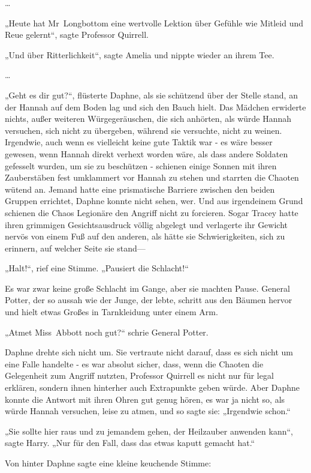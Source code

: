 {…

„Heute hat Mr~Longbottom eine wertvolle Lektion über Gefühle wie Mitleid und Reue gelernt“, sagte Professor Quirrell.

„Und über Ritterlichkeit“, sagte Amelia und nippte wieder an ihrem Tee.

…

„Geht es dir gut?“, flüsterte Daphne, als sie schützend über der Stelle stand, an der Hannah auf dem Boden lag und sich den Bauch hielt. Das Mädchen erwiderte nichts, außer weiteren Würgegeräuschen, die sich anhörten, als würde Hannah versuchen, sich nicht zu übergeben, während sie versuchte, nicht zu weinen. Irgendwie, auch wenn es vielleicht keine gute Taktik war - es wäre besser gewesen, wenn Hannah direkt verhext worden wäre, als dass andere Soldaten gefesselt wurden, um sie zu beschützen - schienen einige Sonnen mit ihren Zauberstäben fest umklammert vor Hannah zu stehen und starrten die Chaoten wütend an. Jemand hatte eine prismatische Barriere zwischen den beiden Gruppen errichtet, Daphne konnte nicht sehen, wer. Und aus irgendeinem Grund schienen die Chaos Legionäre den Angriff nicht zu forcieren. Sogar Tracey hatte ihren grimmigen Gesichtsausdruck völlig abgelegt und verlagerte ihr Gewicht nervös von einem Fuß auf den anderen, als hätte sie Schwierigkeiten, sich zu erinnern, auf welcher Seite sie stand—

„Halt!“, rief eine Stimme. „Pausiert die Schlacht!“

Es war zwar keine große Schlacht im Gange, aber sie machten Pause. General Potter, der so aussah wie der Junge, der lebte, schritt aus den Bäumen hervor und hielt etwas Großes in Tarnkleidung unter einem Arm.

„Atmet Miss~Abbott noch gut?“ schrie General Potter.

Daphne drehte sich nicht um. Sie vertraute nicht darauf, dass es sich nicht um eine Falle handelte - es war absolut sicher, dass, wenn die Chaoten die Gelegenheit zum Angriff nutzten, Professor Quirrell es nicht nur für legal erklären, sondern ihnen hinterher auch Extrapunkte geben würde. Aber Daphne konnte die Antwort mit ihren Ohren gut genug hören, es war ja nicht so, als würde Hannah versuchen, leise zu atmen, und so sagte sie: „Irgendwie schon.“

„Sie sollte hier raus und zu jemandem gehen, der Heilzauber anwenden kann“, sagte Harry. „Nur für den Fall, dass das etwas kaputt gemacht hat.“

Von hinter Daphne sagte eine kleine keuchende Stimme:

}
